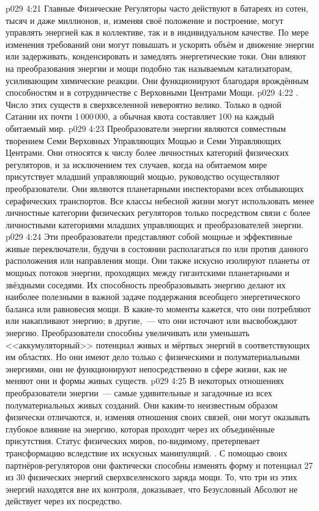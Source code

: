 \vs p029 4:21 Главные Физические Регуляторы часто действуют в батареях из сотен, тысяч и даже миллионов, и, изменяя своё положение и построение, могут управлять энергией как в коллективе, так и в индивидуальном качестве. По мере изменения требований они могут повышать и ускорять объём и движение энергии или задерживать, конденсировать и замедлять энергетические токи. Они влияют на преобразования энергии и мощи подобно так называемым катализаторам, усиливающим химические реакции. Они функционируют благодаря врождённым способностям и в сотрудничестве с Верховными Центрами Мощи.
\vs p029 4:22 . Число этих существ в сверхвселенной невероятно велико. Только в одной Сатании их почти 1\,000\,000, а обычная квота составляет 100 на каждый обитаемый мир.
\vs p029 4:23 Преобразователи энергии являются совместным творением Семи Верховных Управляющих Мощью и Семи Управляющих Центрами. Они относятся к числу более личностных категорий физических регуляторов, и за исключением тех случаев, когда на обитаемом мире присутствует младший управляющий мощью, руководство осуществляют преобразователи. Они являются планетарными инспекторами всех отбывающих серафических транспортов. Все классы небесной жизни могут использовать менее личностные категории физических регуляторов только посредством связи с более личностными категориями младших управляющих и преобразователей энергии.
\vs p029 4:24 Эти преобразователи представляют собой мощные и эффективные живые переключатели, будучи в состоянии располагаться по или против данного расположения или направления мощи. Они также искусно изолируют планеты от мощных потоков энергии, проходящих между гигантскими планетарными и звёздными соседями. Их способность преобразовывать энергию делают их наиболее полезными в важной задаче поддержания всеобщего энергетического баланса или равновесия мощи. В какие\hyp{}то моменты кажется, что они потребляют или накапливают энергию; в другие,~--- что они источают или высвобождают энергию. Преобразователи способны увеличивать или уменьшать <<аккумуляторный>> потенциал живых и мёртвых энергий в соответствующих им областях. Но они имеют дело только с физическими и полуматериальными энергиями, они не функционируют непосредственно в сфере жизни, как не меняют они и формы живых существ.
\vs p029 4:25 В некоторых отношениях преобразователи энергии~--- самые удивительные и загадочные из всех полуматериальных живых созданий. Они каким\hyp{}то неизвестным образом физически отличаются, и, изменяя отношения своих связей, они могут оказывать глубокое влияние на энергию, которая проходит через их объединённые присутствия. Статус физических миров, по\hyp{}видимому, претерпевает трансформацию вследствие их искусных манипуляций. . С помощью своих партнёров\hyp{}регуляторов они фактически способны изменять форму и потенциал 27 из 30 физических энергий сверхвселенского заряда мощи. То, что три из этих энергий находятся вне их контроля, доказывает, что Безусловный Абсолют не действует через их посредство.
